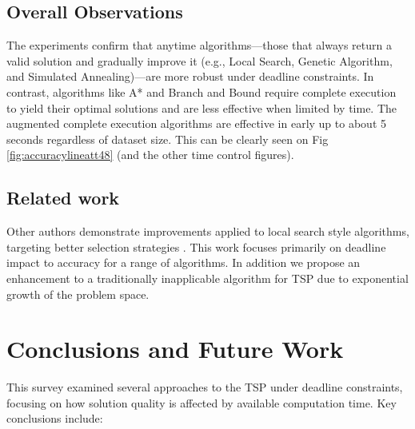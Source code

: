 \documentclass[11pt]{article}
\begin{document}
	\subsection{Overall Observations}
	The experiments confirm that anytime algorithms—those that always return a valid solution and gradually improve it (e.g., Local Search, Genetic Algorithm, and Simulated Annealing)—are more robust under deadline constraints. In contrast, algorithms like A* and Branch and Bound require complete execution to yield their optimal solutions and are less effective when limited by time. The augmented complete execution algorithms are effective in early up to about 5 seconds regardless of dataset size. This can be clearly seen on Fig \ref{fig:accuracylineatt48} (and the other time control figures).
	
	\subsection{Related work}
	Other authors demonstrate improvements applied to local search style algorithms, targeting better selection strategies \cite{8367362}\cite{6492788}. This work focuses primarily on deadline impact to accuracy for a range of algorithms. In addition we propose an enhancement to a traditionally inapplicable algorithm for TSP due to exponential growth of the problem space.
	
	\section{Conclusions and Future Work}
	This survey examined several approaches to the TSP under deadline constraints, focusing on how solution quality is affected by available computation time. Key conclusions include:
	
\end{document}

